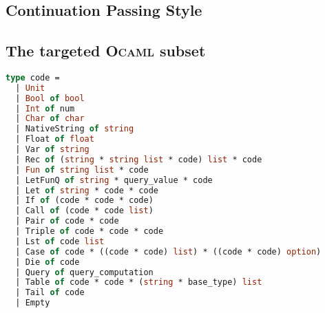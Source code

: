 \documentclass[11pt]{article}
\newcommand\mysc[1]{{\rmfamily\textsc{#1}}\xspace}
\newcommand\ocaml{\mysc{Ocaml}}
\begin{document}
\subsection*{Continuation Passing Style\label{cps}}

\subsection*{The targeted \ocaml subset\label{ocamlsubset}}
\begin{lstlisting}[language=ML]
type code =
  | Unit
  | Bool of bool
  | Int of num
  | Char of char
  | NativeString of string
  | Float of float
  | Var of string
  | Rec of (string * string list * code) list * code
  | Fun of string list * code 
  | LetFunQ of string * query_value * code
  | Let of string * code * code
  | If of (code * code * code)
  | Call of (code * code list)
  | Pair of code * code
  | Triple of code * code * code
  | Lst of code list
  | Case of code * ((code * code) list) * ((code * code) option)
  | Die of code
  | Query of query_computation
  | Table of code * code * (string * base_type) list
  | Tail of code
  | Empty
\end{lstlisting}
\end{document}
